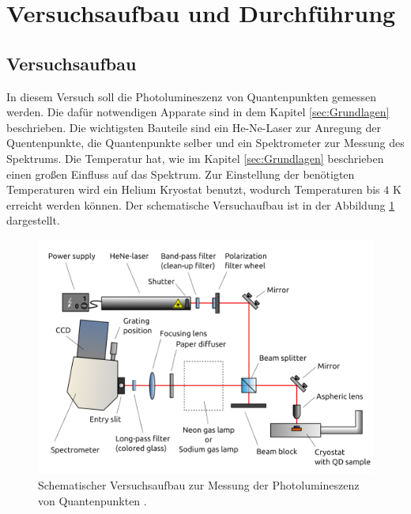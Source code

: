 \section{Versuchsaufbau und Durchf\"uhrung}
\subsection{Versuchsaufbau}
In diesem Versuch soll die Photolumineszenz von Quantenpunkten gemessen werden. Die dafür notwendigen Apparate sind in dem Kapitel \ref{sec:Grundlagen} beschrieben. 
Die wichtigsten Bauteile sind ein He-Ne-Laser zur Anregung der Quentenpunkte, die Quantenpunkte selber und ein Spektrometer zur Messung des Spektrums. 
Die Temperatur hat, wie im Kapitel \ref{sec:Grundlagen} beschrieben einen großen Einfluss auf das Spektrum. 
Zur Einstellung der benötigten Temperaturen wird ein Helium Kryostat benutzt, wodurch Temperaturen bis $4$ K erreicht werden können. 
Der schematische Versuchaufbau ist in der Abbildung \ref{fig:Versuchsaufbau} dargestellt.  
\begin{figure}[H]
\centering
\includegraphics[scale=0.2]{versuchsaufbau.PNG}
\caption{Schematischer Versuchsaufbau zur Messung der Photolumineszenz von Quantenpunkten \cite{anleitung}.   }
\label{fig:Versuchsaufbau}
\end{figure}
